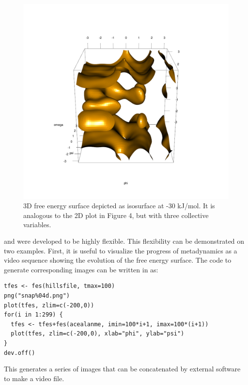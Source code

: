 \begin{figure}

{\centering \includegraphics[width=0.8\linewidth]{fig8} 

}

\caption{3D free energy surface depicted as isosurface at -30 kJ/mol. It is analogous to the 2D plot in Figure 4, but with three collective variables.}\label{fig:fes3d}
\end{figure}

 and  were developed to be highly flexible.
This flexibility can be demonstrated on two examples. First, it is
useful to visualize the progress of metadynamics as a video sequence showing
the evolution of the free energy surface. The code to generate
corresponding images can be written in  as:

\begin{verbatim}
tfes <- fes(hillsfile, tmax=100)
png("snap%04d.png")
plot(tfes, zlim=c(-200,0))
for(i in 1:299) {
  tfes <- tfes+fes(acealanme, imin=100*i+1, imax=100*(i+1))
  plot(tfes, zlim=c(-200,0), xlab="phi", ylab="psi")
}
dev.off()
\end{verbatim}

This generates a series of images that can be concatenated by external
software to make a video file.

